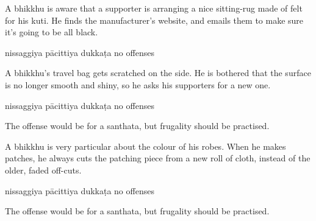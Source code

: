 \begin{exam}{\autoExamName}
\begin{problem*}
\begin{parts}
      \bigskip

      \item A bhikkhu is aware that a supporter is arranging a nice sitting-rug
      made of felt for his kuti. He finds the manufacturer's website, and emails
      them to make sure it's going to be all black.

      \bigskip

      \begin{answers}{3}
        \bChoices
         nissaggiya pācittiya\eAns
         dukkaṭa\eAns
         no offenses\eAns
        \eChoices
      \end{answers}

      \bigskip

      \item A bhikkhu's travel bag gets scratched on the side. He is bothered
      that the surface is no longer smooth and shiny, so he asks his supporters
      for a new one.

      \bigskip

      \begin{answers}{3}
        \bChoices
         nissaggiya pācittiya\eAns
         dukkaṭa\eAns
         no offenses\eAns
        \eChoices
      \end{answers}

      \begin{solution}
        The offense would be for a santhata, but frugality should be practised.
      \end{solution}

      \bigskip

      \item A bhikkhu is very particular about the colour of his robes. When he
      makes patches, he always cuts the patching piece from a new roll of cloth,
      instead of the older, faded off-cuts.

      \bigskip

      \begin{answers}{3}
        \bChoices
         nissaggiya pācittiya\eAns
         dukkaṭa\eAns
         no offenses\eAns
        \eChoices
      \end{answers}

      \begin{solution}
        The offense would be for a santhata, but frugality should be practised.
      \end{solution}

    \end{parts}

  \end{problem*}

\end{exam}
